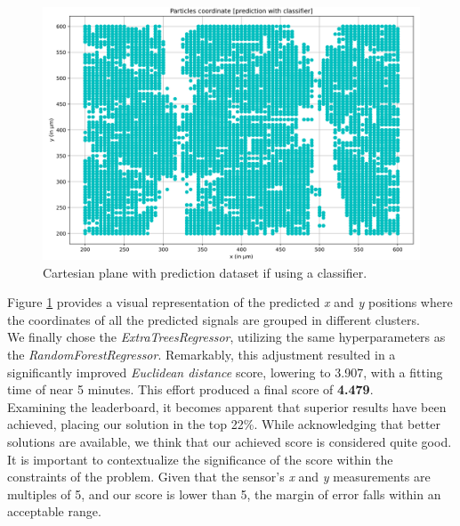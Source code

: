 \documentclass[conference]{IEEEtran}
\begin{document}
\begin{figure}[htbp]
\centerline{\includegraphics[width=\linewidth]{media/plot_prediction_classifier.png}}
\caption{Cartesian plane with prediction dataset if using a classifier.}
\label{fig:cartesian_plane_prediction_classifier}
\end{figure}

Figure \ref{fig:cartesian_plane_prediction_classifier} provides a visual 
representation of the predicted \textit{x} and \textit{y} positions where the 
coordinates of all the predicted signals are grouped in different clusters.\\

We finally chose the \textit{ExtraTreesRegressor}, utilizing 
the same hyperparameters as the \textit{RandomForestRegressor}. Remarkably, this adjustment 
resulted in a significantly improved \textit{Euclidean distance} score, lowering to 3.907, with a 
fitting time of near 5 minutes. This effort produced a final score of \textbf{4.479}.\\

Examining the leaderboard, it becomes apparent that superior results have been achieved,
placing our solution in the top 22\%. While acknowledging that better solutions are 
available, we think that our achieved score is considered quite good. 
It is important to contextualize the significance of the score within the constraints
of the problem. Given that the sensor's \textit{x} and \textit{y}
measurements are multiples of 5, 
and our score is lower than 5, the margin of error falls within an acceptable range.\\\\




\end{document}
